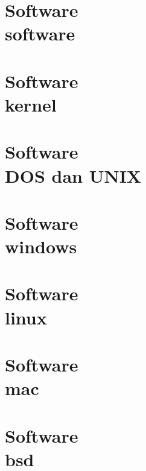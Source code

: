 \documentclass{WileySix}
\begin{document}
\chapter[Software]
{Software\\ software}


%

\chapter[Kernel]
{Software\\ kernel}


\chapter[Perintah DOS dan UNIX]
{Software\\ DOS dan UNIX}


\chapter[Windows]
{Software\\ windows}


\chapter[Linux]
{Software\\ linux}


\chapter[Macintosh]
{Software\\ mac}


\chapter[Free BSD]
{Software\\ bsd}


%
\end{document}
